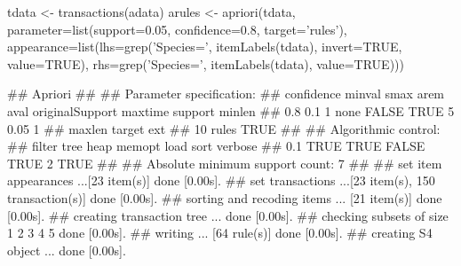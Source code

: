 \documentclass{article}\usepackage[]{graphicx}\usepackage[]{color}
\begin{document}
\begin{Schunk}
% --begin: "casestudy-assoc-arules"
%
% --end: "casestudy-assoc-arules"
\end{Schunk}

\begin{Schunk}
% --begin: "casestudy-assoc-arules-search"
\begin{Sinput}
tdata <- transactions(adata)
arules <- apriori(tdata, 
                  parameter=list(support=0.05,
                                 confidence=0.8,
                                 target='rules'),
                  appearance=list(lhs=grep('Species=', itemLabels(tdata), invert=TRUE, value=TRUE),
                                  rhs=grep('Species=', itemLabels(tdata), value=TRUE)))
\end{Sinput}
\begin{Soutput}
## Apriori
## 
## Parameter specification:
##  confidence minval smax arem  aval originalSupport maxtime support minlen
##         0.8    0.1    1 none FALSE            TRUE       5    0.05      1
##  maxlen target  ext
##      10  rules TRUE
## 
## Algorithmic control:
##  filter tree heap memopt load sort verbose
##     0.1 TRUE TRUE  FALSE TRUE    2    TRUE
## 
## Absolute minimum support count: 7 
## 
## set item appearances ...[23 item(s)] done [0.00s].
## set transactions ...[23 item(s), 150 transaction(s)] done [0.00s].
## sorting and recoding items ... [21 item(s)] done [0.00s].
## creating transaction tree ... done [0.00s].
## checking subsets of size 1 2 3 4 5 done [0.00s].
## writing ... [64 rule(s)] done [0.00s].
## creating S4 object  ... done [0.00s].
\end{Soutput}
%
% --end: "casestudy-assoc-arules-search"
\end{Schunk}
\end{document}

